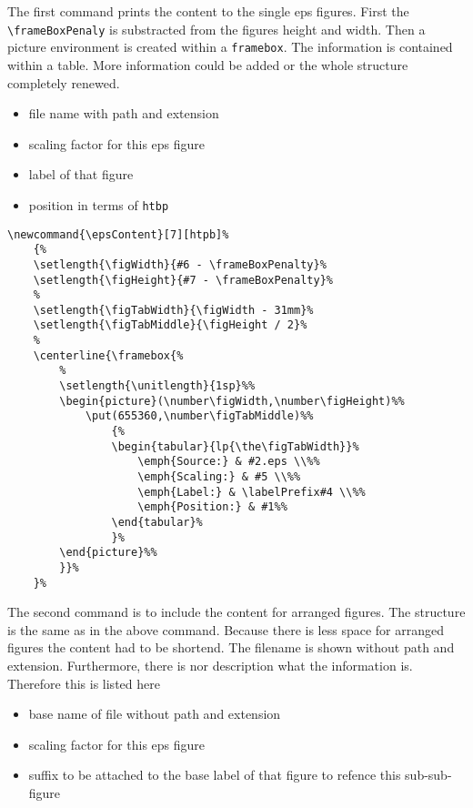 \documentclass[12pt,a4paper]{article}
\newcommand{\comm}[1]{\texttt{#1}}
\begin{document}
The first command prints the content to the single eps figures. First the \verb+\frameBoxPenaly+ is substracted
from the figures height and width. Then a picture environment is created within a \comm{framebox}. The information 
is contained within a table. More information could be added or the whole structure completely renewed.

\begin{itemize}
  \item file name with path and extension
  \item scaling factor for this eps figure
  \item label of that figure
  \item position in terms of \comm{htbp}
\end{itemize}

\begin{verbatim}
\newcommand{\epsContent}[7][htpb]%
    {%
    \setlength{\figWidth}{#6 - \frameBoxPenalty}%
    \setlength{\figHeight}{#7 - \frameBoxPenalty}%
    %
    \setlength{\figTabWidth}{\figWidth - 31mm}%
    \setlength{\figTabMiddle}{\figHeight / 2}%
    %
    \centerline{\framebox{%
        %
        \setlength{\unitlength}{1sp}%%
        \begin{picture}(\number\figWidth,\number\figHeight)%%
            \put(655360,\number\figTabMiddle)%%
                {%
                \begin{tabular}{lp{\the\figTabWidth}}%
                    \emph{Source:} & #2.eps \\%%
                    \emph{Scaling:} & #5 \\%%
                    \emph{Label:} & \labelPrefix#4 \\%%
                    \emph{Position:} & #1%%
                \end{tabular}%
                }%    
        \end{picture}%%
        }}%
    }%
\end{verbatim}

The second command is to include the content for arranged figures. The structure is
the same as in the above command. Because there is less space for arranged figures the 
content had to be shortend. The filename is shown without path and extension. Furthermore,
there is nor description what the information is. Therefore this is listed here

\begin{itemize}
  \item base name of file without path and extension
  \item scaling factor for this eps figure
  \item suffix to be attached to the base label of that figure to refence this sub-sub-figure
\end{itemize}
\end{document}
